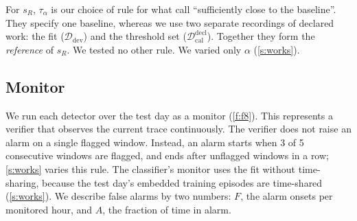 For $s_R$, $\tau_\alpha$ is our choice of rule for what \citet{scher2025} call
``sufficiently close to the baseline''. They
specify one baseline, whereas we use two separate recordings of declared work: the fit
($\mathcal{D}_{\mathrm{dev}}$) and the threshold set
($\mathcal{D}_{\mathrm{cal}}^{\mathrm{decl}}$). Together they form the \emph{reference} of
$s_R$. We tested no other rule. We varied only $\alpha$ (\cref{s:works}).

\subsection{Monitor}\label{s:monitor}
We run each detector over the test day as a monitor (\cref{f:f8}). This represents a verifier that
observes the current trace continuously. The verifier does not raise an alarm on a
single flagged window. Instead, an alarm starts when 3 of 5 consecutive windows are
flagged, and ends after \Rearm{} unflagged windows in a row;
\cref{s:works} varies this rule. The classifier's monitor uses the fit without
time-sharing, because the test day's embedded training episodes are time-shared
(\cref{s:works}). We describe false
alarms by two numbers: $F$, the alarm onsets per monitored hour, and $A$, the fraction
of time in alarm.
